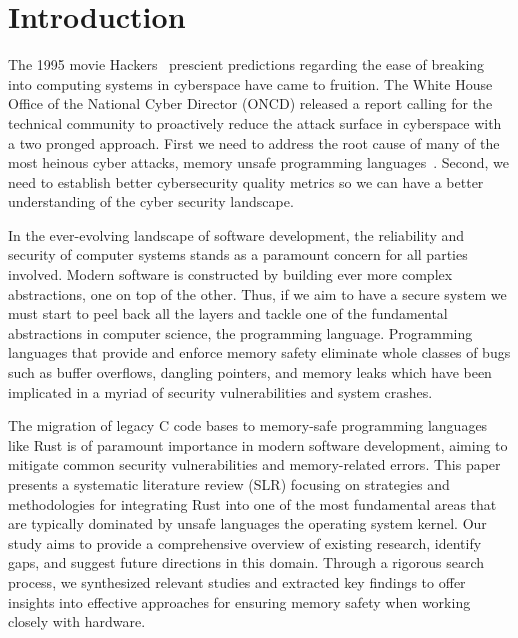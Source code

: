 \documentclass[sigconf]{acmart}
\begin{document}


\maketitle

\section{Introduction}

The 1995 movie Hackers~\cite{Wikipedia_contributors2024-zr} prescient predictions regarding the ease of breaking into computing systems in cyberspace have came to fruition. The White House Office of the National Cyber Director (ONCD) released a report calling for the technical community to proactively reduce the attack surface in cyberspace with a two pronged approach. First we need to address the root cause of many of the most heinous cyber attacks, memory unsafe programming languages~\cite{United_States_Gov2024-pp}. Second, we need to establish better cybersecurity quality metrics so we can have a better understanding of the cyber security landscape.

In the ever-evolving landscape of software development, the reliability and security of computer systems stands as a paramount concern for all parties involved. Modern software is constructed by building ever more complex abstractions, one on top of the other. Thus, if we aim to have a secure system we must start to peel back all the layers and tackle one of the fundamental abstractions in computer science, the programming language. Programming languages that provide and enforce memory safety eliminate whole classes of bugs such as buffer overflows, dangling pointers, and memory leaks which have been implicated in a myriad of security vulnerabilities and system crashes.

The migration of legacy C code bases to memory-safe programming languages like Rust is of paramount importance in modern software development, aiming to mitigate common security vulnerabilities and memory-related errors. This paper presents a systematic literature review (SLR) focusing on strategies and methodologies for integrating Rust into one of the most fundamental areas that are typically dominated by unsafe languages the operating system kernel. Our study aims to provide a comprehensive overview of existing research, identify gaps, and suggest future directions in this domain. Through a rigorous search process, we synthesized relevant studies and extracted key findings to offer insights into effective approaches for ensuring memory safety when working closely with hardware.
\end{document}
